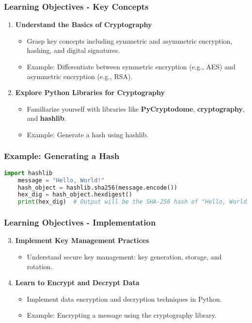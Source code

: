 \documentclass{beamer}
\begin{document}
\begin{frame}
    \frametitle{Learning Objectives - Key Concepts}
    \begin{enumerate}
        \item \textbf{Understand the Basics of Cryptography}
        \begin{itemize}
            \item Grasp key concepts including symmetric and asymmetric encryption, hashing, and digital signatures.
            \item Example: Differentiate between symmetric encryption (e.g., AES) and asymmetric encryption (e.g., RSA).
        \end{itemize}
        
        \item \textbf{Explore Python Libraries for Cryptography}
        \begin{itemize}
            \item Familiarize yourself with libraries like \textbf{PyCryptodome}, \textbf{cryptography}, and \textbf{hashlib}.
            \item Example: Generate a hash using hashlib.
        \end{itemize}
    \end{enumerate}
\end{frame}

\begin{frame}[fragile]
    \frametitle{Example: Generating a Hash}
    \begin{lstlisting}[language=Python]
    import hashlib
    message = "Hello, World!"
    hash_object = hashlib.sha256(message.encode())
    hex_dig = hash_object.hexdigest()
    print(hex_dig)  # Output will be the SHA-256 hash of "Hello, World!"
    \end{lstlisting}
\end{frame}

\begin{frame}
    \frametitle{Learning Objectives - Implementation}
    \begin{enumerate}
        \setcounter{enumi}{2}
        \item \textbf{Implement Key Management Practices}
        \begin{itemize}
            \item Understand secure key management: key generation, storage, and rotation.
        \end{itemize}
        
        \item \textbf{Learn to Encrypt and Decrypt Data}
        \begin{itemize}
            \item Implement data encryption and decryption techniques in Python.
            \item Example: Encrypting a message using the cryptography library.
        \end{itemize}
    \end{enumerate}
\end{frame}
\end{document}
